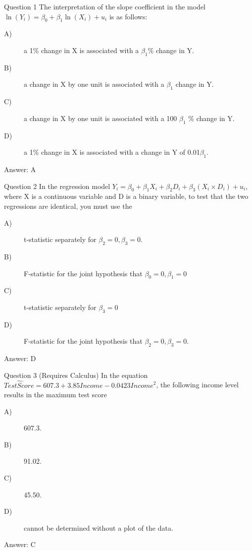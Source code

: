 \documentclass[presentation,10pt]{beamer}
\begin{document}
\begin{frame}[label={sec:org7f8451c}]{Question 1}
The interpretation of the slope coefficient in the model \(\ln(Y_i) =
\beta_0 + \beta_1 \ln(X_i)+ u_i\) is as follows:
\begin{description}
\item[{A)}] a 1\% change in X is associated with a \(\beta_{\text{1}}\)\% change in Y.
\item[{B)}] a change in X by one unit is associated with a \(\beta_{\text{1}}\) change in Y.
\item[{C)}] a change in X by one unit is associated with a 100 \(\beta_{\text{1}}\) \% change in Y.
\item[{D)}] a 1\% change in X is associated with a change in Y of 0.01\(\beta_{\text{1}}\).
\end{description}
\pause
Answer: A
\end{frame}

\begin{frame}[label={sec:orge291d30}]{Question 2}
In the regression model \(Y_i = \beta_0 + \beta_1 X_i + \beta_2 D_i +
\beta_3 (X_i \times D_i) + u_i\), where X is a continuous variable and
D is a binary variable, to test that the two regressions are
identical, you must use the
\begin{description}
\item[{A)}] t-statistic separately for \(\beta_2 = 0, \beta_3 = 0\).
\item[{B)}] F-statistic for the joint hypothesis that \(\beta_0 = 0,
        \beta_1 = 0\)
\item[{C)}] t-statistic separately for \(\beta_3 = 0\)
\item[{D)}] F-statistic for the joint hypothesis that \(\beta_2 = 0,
        \beta_3 = 0\).
\end{description}
\pause
Answer:  D

\pause
\end{frame}
\begin{frame}[label={sec:orgf178908}]{Question 3}
(Requires Calculus)  In the equation \(\widehat{TestScore} = 607.3 +
3.85 Income - 0.0423 Income^2\), the following income level results in
the maximum test score
\begin{description}
\item[{A)}] 607.3.
\item[{B)}] 91.02.
\item[{C)}] 45.50.
\item[{D)}] cannot be determined without a plot of the data.
\end{description}
\pause
Answer:  C
\end{frame}
\end{document}
